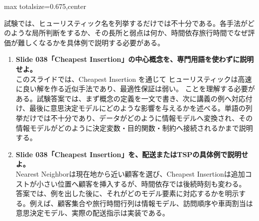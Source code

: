 \begin{adjustbox}{max totalsize={\textwidth}{0.675\textheight},center}
\begin{minipage}{\textwidth}
\begin{minipage}[t]{0.485\textwidth}
試験では、ヒューリスティック名を列挙するだけでは不十分である。各手法がどのような局所判断をするか、その長所と弱点は何か、時間依存旅行時間でなぜ評価が難しくなるかを具体例で説明する必要がある。\par
{}
\begin{enumerate}
\item \textbf{Slide 038「Cheapest Insertion」の中心概念を、専門用語を使わずに説明せよ。}\\このスライドでは、Cheapest Insertion を通じて ヒューリスティックは高速に良い解を作る近似手法であり、最適性保証は弱い。 ことを理解する必要がある。試験答案では、まず概念の定義を一文で書き、次に講義の例へ対応付け、最後に意思決定モデルにどのような影響を与えるかを述べる。単語の列挙だけでは不十分であり、データがどのように情報モデルへ変換され、その情報モデルがどのように決定変数・目的関数・制約へ接続されるかまで説明する。
\item \textbf{Slide 038「Cheapest Insertion」を、配送またはTSPの具体例で説明せよ。}\\Nearest Neighborは現在地から近い顧客を選び、Cheapest Insertionは追加コストが小さい位置へ顧客を挿入するが、時間依存では後続時刻も変わる。 答案では、例を出した後に、それがどのモデル要素に対応するかを明示する。例えば、顧客集合や旅行時間行列は情報モデル、訪問順序や車両割当は意思決定モデル、実際の配送指示は実装である。
\end{enumerate}
\end{minipage}
\end{minipage}
\end{adjustbox}


